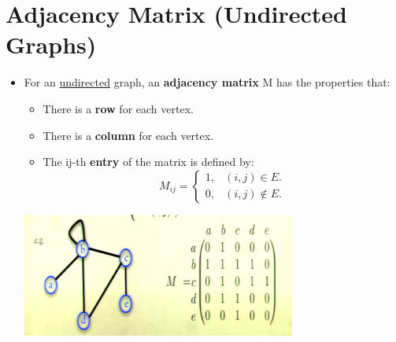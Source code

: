 \documentclass[12pt]{article}
\begin{document}
\section{Adjacency Matrix (Undirected Graphs)}
\renewcommand{\labelitemii}{$\circ$}
\renewcommand{\labelitemiii}{$\cdot$}
\renewcommand{\labelitemiii}{$\rightarrow$}
\renewcommand{\labelitemiv}{$\star$}
\begin{itemize}
\item For an \underline{undirected} graph, an \textbf{adjacency matrix} M has the properties that:
	\begin{itemize}
	\item There is a \textbf{row} for each vertex.
	\item There is a \textbf{column} for each vertex.
	\item The ij-th \textbf{entry} of the matrix is defined by:
	\begin{equation*}
  	M_{ij} = \begin{cases}
    	1, & \text{$(i, j) \in E$}.\\
    	0, & \text{$(i, j) \not\in E$}.
  	\end{cases}
	\end{equation*}
	\end{itemize}
\begin{center}
\includegraphics{lecture73}
\end{center}
\end{itemize}
\end{document}
